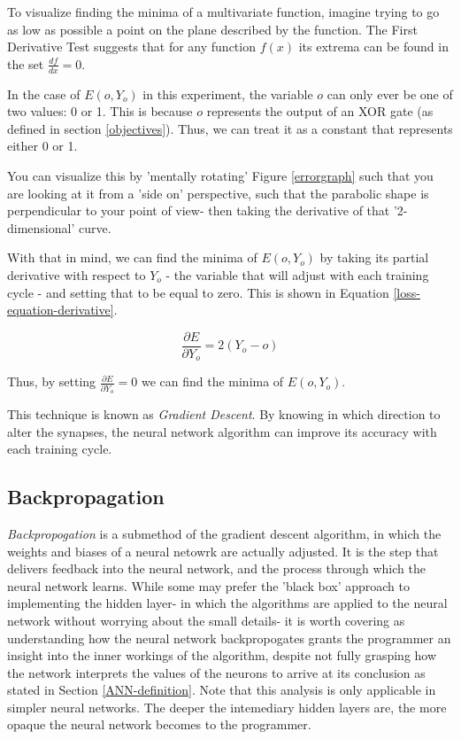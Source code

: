 \documentclass[12pt]{article}
\begin{document}
To visualize finding the minima of a multivariate function, imagine trying to go as low as possible a point on the plane described by the function. The First Derivative Test suggests that for any function $f(x)$ its extrema can be found in the set $\frac{df}{dx} = 0$.

In the case of \(E(o, Y_o)\) in this experiment, the variable $o$ can only ever be one of two values: 0 or 1. This is because $o$ represents the output of an XOR gate (as defined in section \ref{objectives}). Thus, we can treat it as a constant that represents either 0 or 1.

You can visualize this by 'mentally rotating' Figure \ref{errorgraph} such that you are looking at it from a 'side on' perspective, such that the parabolic shape is perpendicular to your point of view- then taking the derivative of that '2-dimensional' curve.

With that in mind, we can find the minima of $E(o, Y_o)$ by taking its partial derivative with respect to $Y_o$ - the variable that will adjust with each training cycle - and setting that to be equal to zero. This is shown in Equation \ref{loss-equation-derivative}.

\begin{equation} \label{loss-equation-derivative}
  \frac{\partial E}{\partial Y_o} = 2 (Y_o - o)
\end{equation}

Thus, by setting $\frac{\partial E}{\partial Y_o} = 0$ we can find the minima of $E(o, Y_o)$.

This technique is known as \textit{Gradient Descent}. By knowing in which direction to alter the synapses, the neural network algorithm can improve its accuracy with each training cycle.

\subsection{Backpropagation \label{backprop}}

\textit{Backpropogation} is a submethod of the gradient descent algorithm, in which the weights and biases of a neural netowrk are actually adjusted. It is the step that delivers feedback into the neural network, and the process through which the neural network learns. While some may prefer the 'black box' approach to implementing the hidden layer- in which the algorithms are applied to the neural network without worrying about the small details- it is worth covering as understanding how the neural network backpropogates grants the programmer an insight into the inner workings of the algorithm, despite not fully grasping how the network interprets the values of the neurons to arrive at its conclusion as stated in Section \ref{ANN-definition}. Note that this analysis is only applicable in simpler neural networks. The deeper the intemediary hidden layers are, the more opaque the neural network becomes to the programmer.
\end{document}
